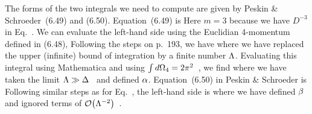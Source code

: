 \documentclass[11pt]{article}
\begin{document}
{	The forms of the two integrals we need to compute are given by Peskin \& Schroeder~(6.49) and (6.50).  Equation~(6.49) is
	Here $m = 3$ because we have $D^{-3}$ in Eq.~.  We can evaluate the left-hand side using the Euclidian 4-momentum defined in (6.48),
	Following the steps on p.~193, we have
	where we have replaced the upper (infinite) bound of integration by a finite number $\Lambda$.  Evaluating this integral using Mathematica and using $\int \dd{\Omega_4} = 2 \pi^2$~\cite[p.~193]{Peskin}, we find
	where we have taken the limit $\Lambda \gg \Delta$~\cite[p.~218]{Peskin} and defined $\alpha$.  Equation~(6.50) in Peskin \& Schroeder is
	Following similar steps as for Eq.~, the left-hand side is
	where we have defined $\beta$ and ignored terms of $\order{\Lam^{-2}}$~\cite[p.~218]{Peskin}. %
	
}
\end{document}
